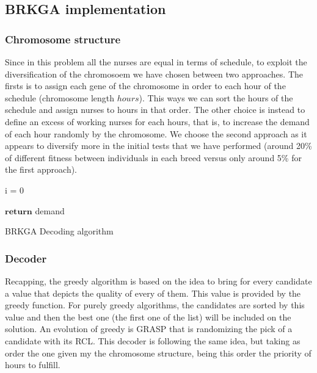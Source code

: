 \subsection{BRKGA implementation}

\subsubsection{Chromosome structure}

Since in this problem all the nurses are equal in terms of schedule, to exploit the diversification of the chromosoem we have chosen between two approaches. The firsts is to assign each gene of the chromosome in order to each hour of the schedule (chromosome length $hours$). This ways we can sort the hours of the schedule and assign nurses to hours in that order. The other choice is instead to define an excess of working nurses for each hours, that is, to increase the demand of each hour randomly by the chromosome. We choose the second approach as it appears to diversify more in the initial tests that we have performed (around 20\% of different fitness between individuals in each breed versus only around 5\% for the first approach).


\begin{algorithm}[H]


i = 0 \\

$\textbf{return}$ demand
\caption{BRKGA Decoding algorithm}\label{brkga.decoding}
\end{algorithm}


\subsubsection{Decoder}

Recapping, the greedy algorithm is based on the idea to bring for every candidate a value that depicts the quality of every of them. This value is provided by the greedy function. For purely greedy algorithms, the candidates are sorted by this value and then the best one (the first one of the list) will be included on the solution. An evolution of greedy is GRASP that is randomizing the pick of a candidate with its RCL. This decoder is following the same idea, but taking as order the one given my the chromosome structure, being this order the priority of hours to fulfill.

